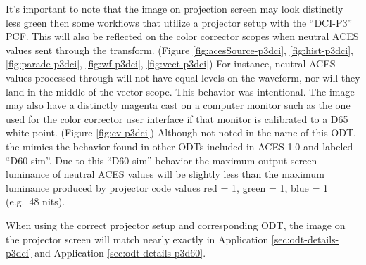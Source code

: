 It's important to note that the image on projection screen may look
distinctly less green then some workflows that utilize a projector setup
with the ``DCI-P3'' PCF. This will also be reflected on the color
corrector scopes when neutral ACES values sent through the
\texttt{} transform. (Figure \ref{fig:acesSource-p3dci}, \ref{fig:hist-p3dci}, \ref{fig:parade-p3dci}, \ref{fig:wf-p3dci}, \ref{fig:vect-p3dci}) For instance,
neutral ACES values processed through
\texttt{} will not have equal levels on
the waveform, nor will they land in the middle of the vector scope. This behavior was intentional. The image may also
have a distinctly magenta cast on a computer monitor such as the one
used for the color corrector user interface if that monitor is
calibrated to a D65 white point. (Figure \ref{fig:cv-p3dci}) Although not noted in the
name of this ODT, the mimics the behavior found in other ODTs included
in ACES 1.0 and labeled ``D60 sim''. Due to this ``D60 sim'' behavior
the maximum output screen luminance of neutral ACES values will be
slightly less than the maximum luminance produced by projector code
values red = 1, green = 1, blue = 1 (e.g.~48 nits).

When using the correct projector setup and corresponding ODT, the image
on the projector screen will match nearly exactly in Application \ref{sec:odt-details-p3dci} and
Application \ref{sec:odt-details-p3d60}.

